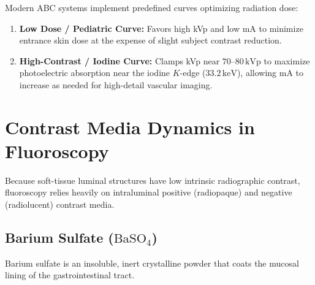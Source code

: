 \documentclass[11pt,a4paper]{article}
\begin{document}
Modern ABC systems implement predefined curves optimizing radiation dose:
\begin{enumerate}[leftmargin=*]
    \item \textbf{Low Dose / Pediatric Curve:} Favors high kVp and low mA to minimize entrance skin dose at the expense of slight subject contrast reduction.
    \item \textbf{High-Contrast / Iodine Curve:} Clamps kVp near $70\text{--}80\,\text{kVp}$ to maximize photoelectric absorption near the iodine $K$-edge ($33.2\,\text{keV}$), allowing mA to increase as needed for high-detail vascular imaging.
\end{enumerate}

\section{Contrast Media Dynamics in Fluoroscopy}

Because soft-tissue luminal structures have low intrinsic radiographic contrast, fluoroscopy relies heavily on intraluminal positive (radiopaque) and negative (radiolucent) contrast media.

\subsection{Barium Sulfate (\texorpdfstring{$\text{BaSO}_4$}{BaSO4})}

Barium sulfate is an insoluble, inert crystalline powder that coats the mucosal lining of the gastrointestinal tract.
\end{document}
